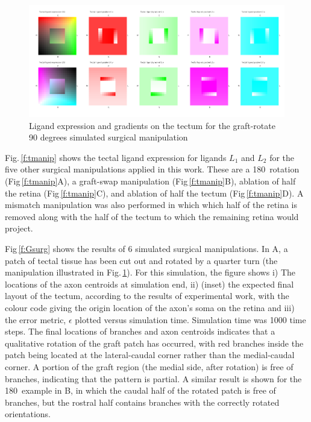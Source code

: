 \documentclass[11pt, a4paper]{article}
\begin{document}
%
\begin{figure}
\includegraphics[width=\linewidth]{./images/Tissuevisb.png}
\caption{Ligand expression and gradients on the tectum for the
graft-rotate 90 degrees simulated surgical manipulation}
\label{f:trot90}
\end{figure}

Fig.\,\ref{f:tmanip} shows the tectal ligand expression for ligands $L_1$ and
$L_2$ for the five other surgical manipulations applied in this work. These
are a 180\degree~rotation (Fig\,\ref{f:tmanip}A), a graft-swap manipulation
(Fig\,\ref{f:tmanip}B), ablation of half the retina (Fig\,\ref{f:tmanip}C),
and ablation of half the tectum (Fig\,\ref{f:tmanip}D). A mismatch
manipulation was also performed in which which half of the retina is removed
along with the half of the tectum to which the remaining retina would project.

Fig\,\ref{f:Gsurg} shows the results of 6 simulated surgical
manipulations. In A, a patch of tectal tissue has been cut out and rotated by
a quarter turn (the manipulation illustrated in Fig.\,\ref{f:trot90}). For
this simulation, the figure shows i) The locations of the axon centroids at
simulation end, ii) (inset) the expected final layout of the tectum, according
to the results of experimental work, with the colour code giving the origin
location of the axon's soma on the retina and iii) the error metric,
$\epsilon$ plotted versus simulation time. Simulation time was 1000 time
steps. The final locations of branches and axon centroids indicates that a
qualitative rotation of the graft patch has occurred, with red branches inside
the patch being located at the lateral-caudal corner rather than the
medial-caudal corner. A portion of the graft region (the medial side, after
rotation) is free of branches, indicating that the pattern is partial. A
similar result is shown for the 180\degree~example in B, in which the caudal
half of the rotated patch is free of branches, but the rostral half contains
branches with the correctly rotated orientations.
\end{document}

